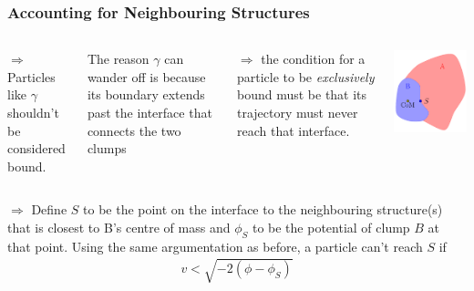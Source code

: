 \begin{frame}
	\frametitle{Accounting for Neighbouring Structures}
	
	\begin{columns}
			$\Rightarrow$ Particles like $\gamma$ shouldn't be considered bound.
			
			The reason $\gamma$ can wander off is because its boundary extends past the interface that connects the two clumps
			
			$\Rightarrow$ the condition for a particle to be \emph{exclusively} bound must be that its trajectory must never reach that interface.
				
			\includegraphics[width=\textwidth]{./images/tikz/saddle.pdf}
			\vspace{1cm}
	\end{columns}

	
	$\Rightarrow$ Define $S$ to be the point on the interface to the neighbouring structure(s) that is closest to B’s centre of mass and $\phi_S$ to be the potential of clump $B$ at that point. Using the same argumentation as before, a particle can't reach $S$ if 
	\begin{align*}
	v < \sqrt{ - 2(\phi - \phi_S) } 
	\end{align*}
	
\end{frame}







